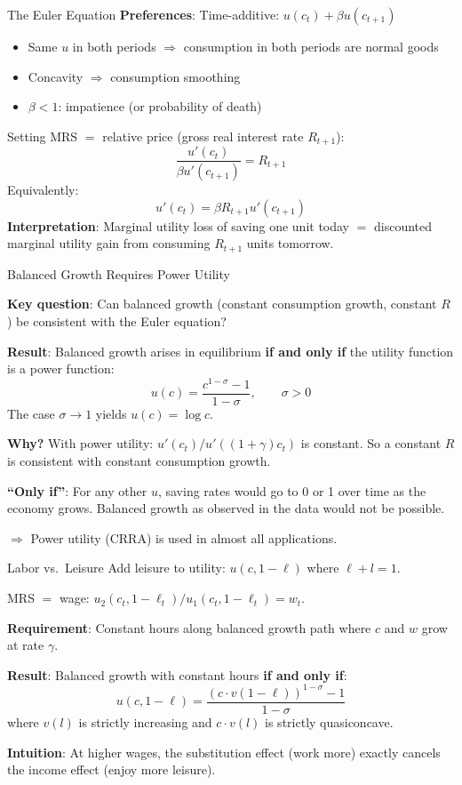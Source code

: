 \documentclass[blue]{beamer}
\begin{document}
\begin{frame}{The Euler Equation}
		\textbf{Preferences}: Time-additive: $u(c_t) + \beta u(c_{t+1})$
		\vspace{-6pt}
	\begin{itemize}
		\item Same $u$ in both periods $\Rightarrow$ consumption in both periods are normal goods
		\item Concavity $\Rightarrow$ consumption smoothing
		\item $\beta < 1$: impatience (or probability of death)
	\end{itemize}
	Setting MRS $=$ relative price (gross real interest rate $R_{t+1}$):
	\[
	\frac{u'(c_t)}{\beta u'(c_{t+1})} = R_{t+1}
	\]
	Equivalently:
	\[
	u'(c_t) = \beta R_{t+1} u'(c_{t+1})
	\]
	\textbf{Interpretation}: Marginal utility loss of saving one unit today $=$ discounted marginal utility gain from consuming $R_{t+1}$ units tomorrow.

\end{frame}



\begin{frame}{Balanced Growth Requires Power Utility}
		
	\textbf{Key question}: Can balanced growth (constant consumption growth, constant $R$) be consistent with the Euler equation?
	
	
	\textbf{Result}: Balanced growth arises in equilibrium \textbf{if and only if} the utility function is a power function:
	\[
	u(c) = \frac{c^{1-\sigma} - 1}{1-\sigma}, \qquad \sigma > 0
	\]
	The case $\sigma \to 1$ yields $u(c) = \log c$.
	
	\textbf{Why?} With power utility: $u'(c_t)/u'((1+\gamma)c_t)$ is constant. So a constant $R$ is consistent with constant consumption growth.


	\textbf{``Only if''}: For any other $u$, saving rates would go to 0 or 1 over time as the economy grows. Balanced growth as observed in the data would not be possible. 
	
	$\Rightarrow$ Power utility (CRRA) is used in almost all applications.
\end{frame}


\begin{frame}{Labor vs.\ Leisure}
	Add leisure to utility: $u(c, 1-\ell)$ where $\ell + l = 1$.
	
	\bigskip
	MRS $=$ wage: $u_2(c_t, 1-\ell_t)/u_1(c_t, 1-\ell_t) = w_t$.
	
	\bigskip
	\textbf{Requirement}: Constant hours along balanced growth path where $c$ and $w$ grow at rate $\gamma$.
	
	\bigskip
	\textbf{Result}: Balanced growth with constant hours \textbf{if and only if}:
	\[
	u(c, 1-\ell) = \frac{(c \cdot v(1-\ell))^{1-\sigma} - 1}{1-\sigma}
	\]
	where $v(l)$ is strictly increasing and $c \cdot v(l)$ is strictly quasiconcave.
	
	\bigskip
	\textbf{Intuition}: At higher wages, the substitution effect (work more) exactly cancels the income effect (enjoy more leisure).
\end{frame}
\end{document}
